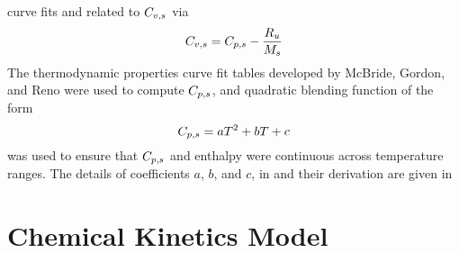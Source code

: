 curve fits and related to $C_{v,s}$ via
\begin{equation}
  C_{v,s} = C_{p,s} - \frac{R_u}{M_s}
  \label{specific-heat-conversion}
\end{equation}
The thermodynamic properties curve fit tables developed by McBride, Gordon, and
Reno\cite{McBride} were used to compute $C_{p,s}$, and quadratic blending function
of the form
\begin{equation}
  C_{p,s} = a T^2 + b T + c
  \label{generic-quad-blending}
\end{equation}
was used to ensure that $C_{p,s}$ and enthalpy were continuous across temperature
ranges.  The details of coefficients $a$, $b$, and $c$, in
 and their derivation are given in

\section{Chemical Kinetics Model}

